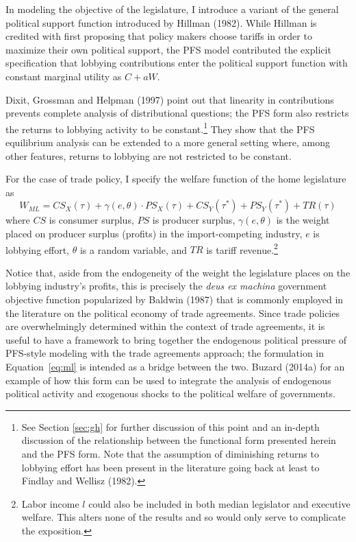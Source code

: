 \documentclass[10pt]{article}
\newcommand{\ve}{\theta}
\newcommand{\ta}{\theta}
\newcommand{\ga}{\gamma}
\begin{document}
In modeling the objective of the legislature, I introduce a variant of the general political support function introduced by Hillman (1982). While Hillman is credited with first proposing that policy makers choose tariffs in order to maximize their own political support, the PFS model contributed the explicit specification that lobbying contributions enter the political support function with constant marginal utility as $C + aW$.

Dixit, Grossman and Helpman (1997) point out that linearity in contributions prevents complete analysis of distributional questions; the PFS form also restricts the returns to lobbying activity to be constant.\footnote{See Section \ref{sec:gh} for further discussion of this point and an in-depth discussion of the relationship between the functional form presented herein and the PFS form. Note that the assumption of diminishing returns to lobbying effort has been present in the literature going back at least to Findlay and Wellisz (1982).} They show that the PFS equilibrium analysis can be extended to a more general setting where, among other features, returns to lobbying are not restricted to be constant. 

For the case of trade policy, I specify the welfare function of the home legislature as
\begin{equation}
  W_{\mathit{ML}} = \mathit{CS}_X(\tau) + \ga(e,\ve) \cdot \mathit{PS}_X(\tau) + \mathit{CS}_Y(\tau^*) + \mathit{PS}_Y(\tau^*) + \mathit{TR}(\tau)
  \label{eq:ml}
\end{equation}
where $\mathit{CS}$ is consumer surplus, $\mathit{PS}$ is producer surplus, $\ga(e,\ta)$ is the weight placed on producer surplus (profits) in the import-competing industry, $e$ is lobbying effort, $\ta$ is a random variable, and $\mathit{TR}$ is tariff revenue.\footnote{Labor income $l$ could also be included in both median legislator and executive welfare. This alters none of the results and so would only serve to complicate the exposition.}

Notice that, aside from the endogeneity of the weight the legislature places on the lobbying industry's profits, this is precisely the \textit{deus ex machina} government objective function popularized by Baldwin (1987) that is commonly employed in the literature on the political economy of trade agreements. Since trade policies are overwhelmingly determined within the context of trade agreements, it is useful to have a framework to bring together the endogenous political pressure of PFS-style modeling with the trade agreements approach; the formulation in Equation~\ref{eq:ml} is intended as a bridge between the two. Buzard (2014a) for an example of how this form can be used to integrate the analysis of endogenous political activity and exogenous shocks to the political welfare of governments.
\end{document}
